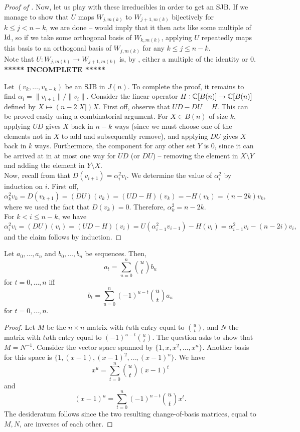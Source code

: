 	\begin{proof}[Proof of ]	
		Now, let us play with these irreducibles in order to get an SJB. If we manage to show that $U$ maps $W_{j,m(k)}$ to $W_{j+1,m(k)}$ bijectively for $k \le j < n-k$, we are done --  would imply that it then acts like some multiple of $\operatorname{Id}$, so if we take some orthogonal basis of $W_{k,m(k)}$, applying $U$ repeatedly maps this basis to an orthogonal basis of $W_{j,m(k)}$ for any $k \le j \le n-k$.\\
		Note that $U : W_{j,m(k)} \to W_{j+1,m(k)}$ is, by , either a multiple of the identity or $0$.\\
		\textbf{***** INCOMPLETE *****}

		Let $(v_k,\ldots,v_{n-k})$ be an SJB in $J(n)$. To complete the proof, it remains to find $\alpha_i = \|v_{i+1}\|/\|v_i\|$. Consider the linear operator $H : \mathbb{C}[B(n)] \to \mathbb{C}[B(n)]$ defined by $X \mapsto (n-2|X|)X$. First off, observe that $UD-DU = H$. This can be proved easily using a combinatorial argument. For $X \in B(n)$ of size $k$, applying $UD$ gives $X$ back in $n-k$ ways (since we must choose one of the elements not in $X$ to add and subsequently remove), and applying $DU$ gives $X$ back in $k$ ways. Furthermore, the component for any other set $Y$ is $0$, since it can be arrived at in at most one way for $UD$ (or $DU$) -- removing the element in $X \setminus Y$ and adding the element in $Y \setminus X$.\\
		Now, recall from  that $D(v_{i+1}) = \alpha_i^2 v_i$. We determine the value of $\alpha_i^2$ by induction on $i$. First off,
		\[ \alpha_k^2 v_k = D(v_{k+1}) = (DU)(v_k) = (UD-H)(v_k) = -H(v_k) = (n-2k)v_k, \]
		where we used the fact that $D(v_k) = 0$. Therefore, $\alpha_k^2 = n-2k$.\\
		For $k < i \le n-k$, we have
		\[ \alpha_i^2 v_i = (DU)(v_i) = (UD-H)(v_i) = U(\alpha_{i-1}^2 v_{i-1}) - H(v_i) = \alpha_{i-1}^2 v_i - (n-2i)v_i, \]
		and the claim follows by induction.
	\end{proof}

	\begin{lemma}
		Let $a_0,\ldots,a_n$ and $b_0,\ldots,b_n$ be sequences. Then,
		\[ a_t = \sum_{u=0}^{n} \binom{u}{t} b_u \]
		for $t=0,\ldots,n$ iff
		\[ b_t = \sum_{u=0}^{n} (-1)^{u-t} \binom{u}{t} a_u \]
		for $t=0,\ldots,n$.
	\end{lemma}
	\begin{proof}
		Let $M$ be the $n \times n$ matrix with $tu$th entry equal to $\binom{u}{t}$, and $N$ the matrix with $tu$th entry equal to $(-1)^{u-t} \binom{u}{t}$. The question asks to show that $M = N^{-1}$. Consider the vector space spanned by $\{1,x,x^2,\ldots,x^n\}$. Another basis for this space is $\{1,(x-1),(x-1)^2,\ldots,(x-1)^n\}$. We have
		\[ x^u = \sum_{t=0}^{n} \binom{u}{t} (x-1)^t \]
		and
		\[ (x-1)^u = \sum_{t=0}^{n} (-1)^{n-t} \binom{u}{t} x^t. \]
		The desideratum follows since the two resulting change-of-basis matrices, equal to $M,N$, are inverses of each other.
	\end{proof}

